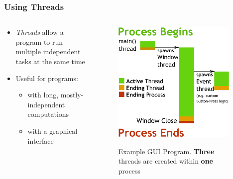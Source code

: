 \documentclass{beamer}
\newcommand{\linespace}{\vskip 0.25cm}
\begin{document}
\begin{frame}
\frametitle{Using Threads}

\begin{columns}
	\begin{column}{0.5\textwidth}
		\begin{itemize}
		\item \emph{Threads} allow a program to run multiple independent tasks at the same time
		
		\linespace
		
		\item Useful for programs:
			\begin{itemize}
  			 \item with long, mostly-independent computations
			 \item with a graphical interface
	  		\end{itemize}
		\end{itemize}
	\end{column}
	
	\begin{column}{0.5\textwidth}
		\begin{figure}
		\includegraphics[width=0.95\textwidth]{Illustrations/ThreadExample_GUI}
		\label{fig:domains}
		\caption{Example GUI Program. \textbf{Three} threads are created within \textbf{one} process}
		\end{figure}
	\end{column}
\end{columns}

\end{frame}
\end{document}
